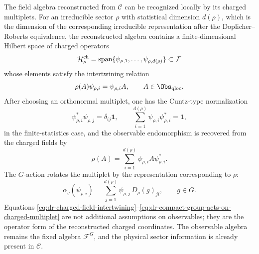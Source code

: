 The field algebra reconstructed from \(\mathcal C\) can be recognized
locally by its charged multiplets.  For an irreducible sector \(\rho\) with
statistical dimension \(d(\rho)\), which is the dimension of the corresponding
irreducible representation after the Doplicher--Roberts equivalence, the
reconstructed algebra contains a finite-dimensional Hilbert space of charged
operators
\[
  \mathcal H_\rho^{\rm ch}
  =
  \operatorname{span}\{\psi_{\rho,1},\ldots,\psi_{\rho,d(\rho)}\}
  \subset\mathcal F
\]
whose elements satisfy the intertwining relation
\begin{equation}
  \rho(A)\psi_{\rho,i}=\psi_{\rho,i}A,
  \qquad A\in\Obs_{\rm qloc}.
  \label{eq:dr-charged-field-intertwining}
\end{equation}
After choosing an orthonormal multiplet, one has the Cuntz-type normalization
\begin{equation}
  \psi_{\rho,i}^*\psi_{\rho,j}=\delta_{ij}\mathbf 1,
  \qquad
  \sum_{i=1}^{d(\rho)}\psi_{\rho,i}\psi_{\rho,i}^*=\mathbf 1,
  \label{eq:dr-charged-field-cuntz-relations}
\end{equation}
in the finite-statistics case, and the observable endomorphism is recovered
from the charged fields by
\begin{equation}
  \rho(A)=\sum_{i=1}^{d(\rho)}\psi_{\rho,i}A\psi_{\rho,i}^* .
  \label{eq:dr-endomorphism-from-charged-fields}
\end{equation}
The \(G\)-action rotates the multiplet by the representation corresponding to
\(\rho\):
\begin{equation}
  \alpha_g(\psi_{\rho,i})
  =
  \sum_{j=1}^{d(\rho)}
  \psi_{\rho,j}\,D_\rho(g)_{ji},
  \qquad
  g\in G .
  \label{eq:dr-compact-group-acts-on-charged-multiplet}
\end{equation}
Equations
\eqref{eq:dr-charged-field-intertwining}--\eqref{eq:dr-compact-group-acts-on-charged-multiplet}
are not additional assumptions on observables; they are the operator form of
the reconstructed charged coordinates.  The observable algebra remains the
fixed algebra \(\mathcal F^G\), and the physical sector information is already
present in \(\mathcal C\).

